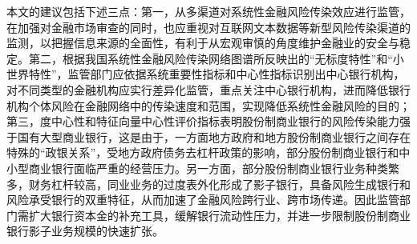 \documentclass[lang=cn]{elegantpaper}
\begin{document}
本文的建议包括下述三点：第一，从多渠道对系统性金融风险传染效应进行监管，在加强对金融市场审查的同时，也应重视对互联网文本数据等新型风险传染渠道的监测，以把握信息来源的全面性，有利于从宏观审慎的角度维护金融业的安全与稳定。第二，根据我国系统性金融风险传染网络图谱所反映出的“无标度特性”和“小世界特性”，监管部门应依据系统重要性指标和中心性指标识别出中心银行机构，对不同类型的金融机构应实行差异化监管，重点关注中心银行机构，进而降低银行机构个体风险在金融网络中的传染速度和范围，实现降低系统性金融风险的目的；第三，度中心性和特征向量中心性评价指标表明股份制商业银行的风险传染能力强于国有大型商业银行，这是由于，一方面地方政府和地方股份制商业银行之间存在特殊的“政银关系”，受地方政府债务去杠杆政策的影响，部分股份制商业银行和中小型商业银行面临严重的经营压力。另一方面，部分股份制商业银行业务种类繁多，财务杠杆较高，同业业务的过度表外化形成了影子银行，具备风险生成银行和风险承受银行的双重特征，从而加速了金融风险跨行业、跨市场传递。因此监管部门需扩大银行资本金的补充工具，缓解银行流动性压力，并进一步限制股份制商业银行影子业务规模的快速扩张。

\end{document}
